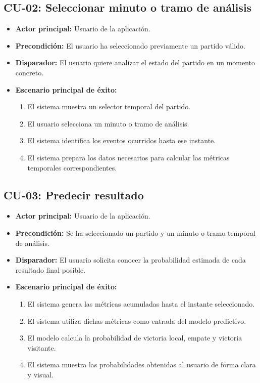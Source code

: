 \subsection*{CU-02: Seleccionar minuto o tramo de análisis}

\begin{itemize}
    \item \textbf{Actor principal:} Usuario de la aplicación.
    \item \textbf{Precondición:} El usuario ha seleccionado previamente un partido válido.
    \item \textbf{Disparador:} El usuario quiere analizar el estado del partido en un momento concreto.
    \item \textbf{Escenario principal de éxito:}
          \begin{enumerate}
              \item El sistema muestra un selector temporal del partido.
              \item El usuario selecciona un minuto o tramo de análisis.
              \item El sistema identifica los eventos ocurridos hasta ese instante.
              \item El sistema prepara los datos necesarios para calcular las métricas temporales correspondientes.
          \end{enumerate}
\end{itemize}

\subsection*{CU-03: Predecir resultado}

\begin{itemize}
    \item \textbf{Actor principal:} Usuario de la aplicación.
    \item \textbf{Precondición:} Se ha seleccionado un partido y un minuto o tramo temporal de análisis.
    \item \textbf{Disparador:} El usuario solicita conocer la probabilidad estimada de cada resultado final posible.
    \item \textbf{Escenario principal de éxito:}
          \begin{enumerate}
              \item El sistema genera las métricas acumuladas hasta el instante seleccionado.
              \item El sistema utiliza dichas métricas como entrada del modelo predictivo.
              \item El modelo calcula la probabilidad de victoria local, empate y victoria visitante.
              \item El sistema muestra las probabilidades obtenidas al usuario de forma clara y visual.
          \end{enumerate}
\end{itemize}

